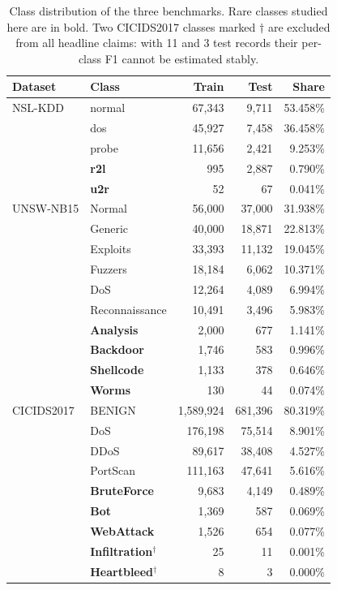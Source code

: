 \begin{table}[t]
\centering
\caption{Class distribution of the three benchmarks. Rare classes studied here are in bold. Two CICIDS2017 classes marked $\dagger$ are excluded from all headline claims: with 11 and 3 test records their per-class F1 cannot be estimated stably.}
\label{tab:datasets}
\begin{tabular}{llrrr}
\toprule
Dataset & Class & Train & Test & Share \\
\midrule
NSL-KDD & normal & 67,343 & 9,711 & 53.458\% \\
 & dos & 45,927 & 7,458 & 36.458\% \\
 & probe & 11,656 & 2,421 & 9.253\% \\
 & \textbf{r2l} & 995 & 2,887 & 0.790\% \\
 & \textbf{u2r} & 52 & 67 & 0.041\% \\
\midrule
UNSW-NB15 & Normal & 56,000 & 37,000 & 31.938\% \\
 & Generic & 40,000 & 18,871 & 22.813\% \\
 & Exploits & 33,393 & 11,132 & 19.045\% \\
 & Fuzzers & 18,184 & 6,062 & 10.371\% \\
 & DoS & 12,264 & 4,089 & 6.994\% \\
 & Reconnaissance & 10,491 & 3,496 & 5.983\% \\
 & \textbf{Analysis} & 2,000 & 677 & 1.141\% \\
 & \textbf{Backdoor} & 1,746 & 583 & 0.996\% \\
 & \textbf{Shellcode} & 1,133 & 378 & 0.646\% \\
 & \textbf{Worms} & 130 & 44 & 0.074\% \\
\midrule
CICIDS2017 & BENIGN & 1,589,924 & 681,396 & 80.319\% \\
 & DoS & 176,198 & 75,514 & 8.901\% \\
 & DDoS & 89,617 & 38,408 & 4.527\% \\
 & PortScan & 111,163 & 47,641 & 5.616\% \\
 & \textbf{BruteForce} & 9,683 & 4,149 & 0.489\% \\
 & \textbf{Bot} & 1,369 & 587 & 0.069\% \\
 & \textbf{WebAttack} & 1,526 & 654 & 0.077\% \\
 & \textbf{Infiltration$^\dagger$} & 25 & 11 & 0.001\% \\
 & \textbf{Heartbleed$^\dagger$} & 8 & 3 & 0.000\% \\
\bottomrule
\end{tabular}
\end{table}
